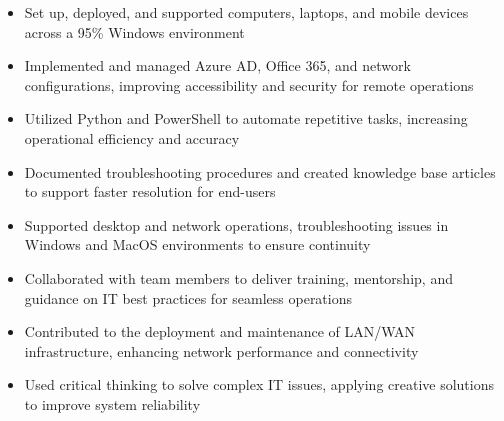 \par\smallskip
\noindent
\begin{minipage}{20cm}
  \begin{minipage}{9.75cm}
    \begin{itemize}
      \item Set up, deployed, and supported computers, laptops, and mobile devices across a 95\% Windows environment
      \item Implemented and managed Azure AD, Office 365, and network configurations, improving accessibility and security for remote operations
    \end{itemize}
  \end{minipage}
  \hfill
  \begin{minipage}{9.75cm}
    \begin{itemize}
      \item Utilized Python and PowerShell to automate repetitive tasks, increasing operational efficiency and accuracy
      \item Documented troubleshooting procedures and created knowledge base articles to support faster resolution for end-users
    \end{itemize}
  \end{minipage}
\end{minipage}
\par\smallskip
\divider

\par\smallskip
\noindent
\begin{minipage}{20cm}
  \begin{minipage}{9.75cm}
    \begin{itemize}
      \item Supported desktop and network operations, troubleshooting issues in Windows and MacOS environments to ensure continuity
      \item Collaborated with team members to deliver training, mentorship, and guidance on IT best practices for seamless operations
    \end{itemize}
  \end{minipage}
  \hfill
  \begin{minipage}{9.75cm}
    \begin{itemize}
      \item Contributed to the deployment and maintenance of LAN/WAN infrastructure, enhancing network performance and connectivity
      \item Used critical thinking to solve complex IT issues, applying creative solutions to improve system reliability
    \end{itemize}
  \end{minipage}
\end{minipage}

